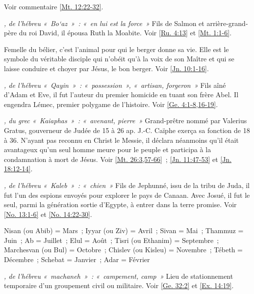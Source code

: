 \begin{multicols}{2}
\textit{}\newline
Voir commentaire \vref{Mt. 12:22-32}.

\textit{, de l'hébreu «~Bo`az~»~: «~en lui est la force~»}\newline
Fils de Salmon et arrière-grand-père du roi David, il épousa Ruth la Moabite. Voir \vref{Ru. 4:13} et \vref{Mt. 1:1-6}.

\textit{}\newline
Femelle du bélier, c'est l'animal pour qui le berger donne sa vie. Elle est le symbole du véritable disciple qui n'obéit qu'à la voix de son Maître et qui se laisse conduire et choyer par Jésus, le bon berger. Voir \vref{Jn. 10:1-16}.

\textit{, de l'hébreu «~Qayin~»~: «~possession~», «~artisan, forgeron~»}\newline
Fils aîné d'Adam et Eve, il fut l'auteur du premier homicide en tuant son frère Abel. Il engendra Lémec, premier polygame de l'histoire. Voir \vref{Ge. 4:1-8,16-19}.

\textit{, du grec «~Kaiaphas~»~: «~avenant, pierre~»}\newline
Grand-prêtre nommé par Valerius Gratus, gouverneur de Judée de 15 à 26 ap. J.-C. Caïphe exerça sa fonction de 18 à 36. N'ayant pas reconnu en Christ le Messie, il déclara néanmoins qu'il était avantageux qu'un seul homme meure pour le peuple et participa à la condamnation à mort de Jésus. Voir \vref{Mt. 26:3,57-66}~; \vref{Jn. 11:47-53} et \vref{Jn. 18:12-14}.

\textit{, de l'hébreu «~Kaleb~»~: «~chien~»}\newline
Fils de Jephunné, issu de la tribu de Juda, il fut l'un des espions envoyés pour explorer le pays de Canaan. Avec Josué, il fut le seul, parmi la génération sortie d'Egypte, à entrer dans la terre promise. Voir \vref{No. 13:1-6} et \vref{No. 14:22-30}.

\textit{}\newline
Nisan (ou Abib) = Mars~; Iyyar (ou Ziv) = Avril~; Sivan = Mai~; Thammuz = Juin~; Ab = Juillet~; Elul = Août~; Tisri (ou Ethanim) = Septembre~; Marchesvan (ou Bul) = Octobre~; Chislev (ou Kisleu) = Novembre~; Tébeth = Décembre~; Schebat = Janvier~; Adar = Février

\textit{, de l'hébreu «~machaneh~»~: «~campement, camp~»}\newline
Lieu de stationnement temporaire d'un groupement civil ou militaire. Voir \vref{Ge. 32:2} et \vref{Ex. 14:19}.


\end{multicols}
